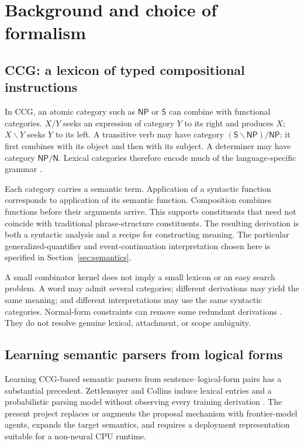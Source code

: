 \documentclass[11pt,a4paper]{article}
\newcommand{\NP}{\mathsf{NP}}
\newcommand{\NC}{\mathsf{N}}
\begin{document}
\section{Background and choice of formalism}\label{sec:background}

\subsection{CCG: a lexicon of typed compositional instructions}
In CCG, an atomic category such as \(\NP\) or \(\mathsf S\) can combine with
functional categories. \(X/Y\) seeks an expression of category \(Y\) to its
right and produces \(X\); \(X\backslash Y\) seeks \(Y\) to its left.
A transitive verb may have category
\((\mathsf S\backslash\NP)/\NP\): it first combines with its object and then
with its subject. A determiner may have category \(\NP/\NC\).
Lexical categories therefore encode much of the language-specific grammar
\cite{clarkcurran}.

Each category carries a semantic term. Application of a syntactic function
corresponds to application of its semantic function. Composition combines
functions before their arguments arrive. This supports constituents that need
not coincide with traditional phrase-structure constituents. The resulting
derivation is both a syntactic analysis and a recipe for constructing meaning.
The particular generalized-quantifier and event-continuation interpretation
chosen here is specified in Section~\ref{sec:semantics}.

A small combinator kernel does not imply a small lexicon or an easy search
problem. A word may admit several categories; different derivations may
yield the same meaning; and different interpretations may use the same
syntactic categories. Normal-form constraints can remove some redundant
derivations \cite{eisner}. They do not resolve genuine lexical, attachment,
or scope ambiguity.

\subsection{Learning semantic parsers from logical forms}
Learning CCG-based semantic parsers from sentence--logical-form pairs has a
substantial precedent. Zettlemoyer and Collins induce lexical entries and a
probabilistic parsing model without observing every training derivation
\cite{zettlemoyer}. The present project replaces or augments the proposal
mechanism with frontier-model agents, expands the target semantics, and
requires a deployment representation suitable for a non-neural CPU runtime.
\end{document}
